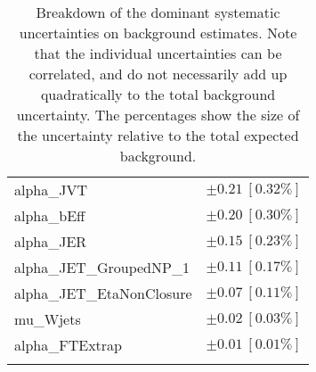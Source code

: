 \begin{table}
\begin{center}
\begin{tabular*}{\textwidth}{@{\extracolsep{\fill}}lc}
alpha\_JVT         & $\pm 0.21\ [0.32\%] $       \\
alpha\_bEff         & $\pm 0.20\ [0.30\%] $       \\
alpha\_JER         & $\pm 0.15\ [0.23\%] $       \\
alpha\_JET\_GroupedNP\_1         & $\pm 0.11\ [0.17\%] $       \\
alpha\_JET\_EtaNonClosure         & $\pm 0.07\ [0.11\%] $       \\
mu\_Wjets         & $\pm 0.02\ [0.03\%] $       \\
alpha\_FTExtrap         & $\pm 0.01\ [0.01\%] $       \\
\noalign{\smallskip}\hline\noalign{\smallskip}
\end{tabular*}
\end{center}
\caption[Breakdown of uncertainty on background estimates]{
Breakdown of the dominant systematic uncertainties on background estimates.
Note that the individual uncertainties can be correlated, and do not necessarily add up quadratically to 
the total background uncertainty. The percentages show the size of the uncertainty relative to the total expected background.
\label{table.results.bkgestimate.uncertainties.VRTopATW}}
\end{table}
%